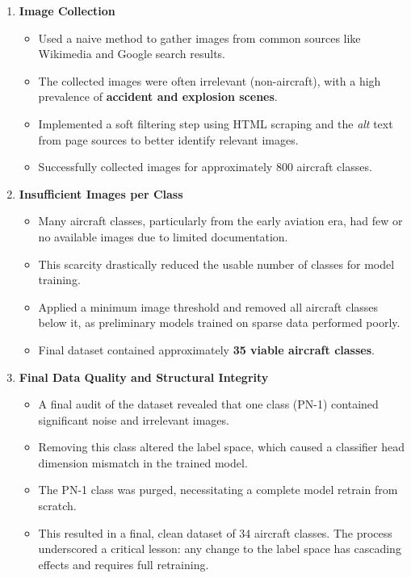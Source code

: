 \documentclass[11pt]{article}
\begin{document}
\begin{enumerate}[label=\textbf{Challenge \arabic*:}]
    \item \textbf{Image Collection}
        \begin{itemize}[leftmargin=1.5em]
            \item[\textbf{Approach:}] Used a naive method to gather images from common sources like Wikimedia and Google search results.
            \item[\textbf{Drawback:}] The collected images were often irrelevant (non-aircraft), with a high prevalence of \textbf{accident and explosion scenes}.
            \item[\textbf{Solution:}] Implemented a soft filtering step using HTML scraping and the \textit{alt} text from page sources to better identify relevant images.
            \item[\textbf{Outcome:}] Successfully collected images for approximately 800 aircraft classes.
    \end{itemize}

    \item \textbf{Insufficient Images per Class}
        \begin{itemize}[leftmargin=1.5em]
            \item[\textbf{Approach:}] Many aircraft classes, particularly from the early aviation era, had few or no available images due to limited documentation.
            \item[\textbf{Drawback:}] This scarcity drastically reduced the usable number of classes for model training.
            \item[\textbf{Solution:}] Applied a minimum image threshold and removed all aircraft classes below it, as preliminary models trained on sparse data performed poorly.
            \item[\textbf{Outcome:}] Final dataset contained approximately \textbf{35 viable aircraft classes}.
    \end{itemize}
    
    \item \textbf{Final Data Quality and Structural Integrity}
    \begin{itemize}[leftmargin=1.5em]
        \item[\textbf{Approach:}] A final audit of the dataset revealed that one class (PN-1) contained significant noise and irrelevant images.
        \item[\textbf{Problem:}] Removing this class altered the label space, which caused a classifier head dimension mismatch in the trained model.
        \item[\textbf{Solution:}] The PN-1 class was purged, necessitating a complete model retrain from scratch.
        \item[\textbf{Outcome:}] This resulted in a final, clean dataset of 34 aircraft classes. The process underscored a critical lesson: any change to the label space has cascading effects and requires full retraining.
    \end{itemize}

    
    \end{enumerate}
\end{document}
